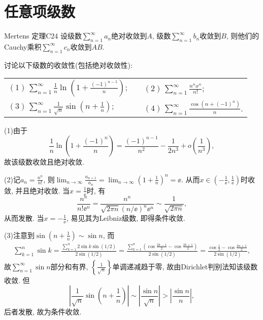 \section{任意项级数}
\begin{theorem}{Mertens 定理}{C24}
设级数\(\sum_{n=1}^{\infty}a_n\)绝对收敛到\(A\), 级数\(\sum_{n=1}^{\infty}b_n\)收敛到\(B\), 则他们的Cauchy乘积\(\sum_{n=1}^{\infty}c_n\)收敛到\(AB\).
\end{theorem}
\begin{quiza}
\woe 讨论以下级数的收敛性(包括绝对收敛性):\vspace{8pt}\\
\begin{tabular}{lcl}
\((1)\,\sum_{n=1}^{\infty}\frac{1}{n}\ln\left(1+\frac{(-1)^{n-1}}{n}\right)\);&\qquad\qquad\qquad&\((2)\,\sum_{n=1}^{\infty}\frac{n^nx^n}{n!}\);\vspace{0.3cm}\\
\((3)\,\sum_{n=1}^{\infty}\frac{1}{\sqrt{n}}\sin\left(n+\frac{1}{n}\right)\);&&\((4)\,\sum_{n=1}^{\infty}\frac{\cos(n+(-1)^n)}{n}\).
\end{tabular}
\begin{solution}
(1)由于\[\frac{1}{n}\ln\left(1+\frac{(-1)^n}{n}\right)=\frac{(-1)^{n-1}}{n^2}-\frac{1}{2n^3}+o\left(\frac{1}{n^3}\right),\]故该级数收敛且绝对收敛.

(2)记\(a_{n}=\frac{n^n}{n!}\), 则\(\lim_{n\rightarrow\infty}\frac{a_{n+1}}{a_{n}}=\lim_{n\rightarrow\infty}\left(1+\frac{1}{n}\right)^n=\ee.\) 从而\(x\in\left(-\frac{1}{\ee},\frac{1}{\ee}\right)\)时收敛, 并且绝对收敛. 当\(x=\frac{1}{\ee}\)时, 有\[\frac{n^n}{n!\ee^n}=\frac{n^n}{\sqrt{2\pi n}(n/\ee)^n\ee^n}\sim\frac{1}{\sqrt{2\pi n}},\]从而发散. 当\(x=-\frac{1}{\ee}\), 易见其为Leibniz级数, 即得条件收敛.

(3)注意到\(\sin\left(n+\frac{1}{n}\right)\sim\sin n\), 而\[\begin{split}
\sum_{k=1}^{n}\sin k=\frac{\displaystyle\sum_{k=1}^{n}2\sin k\sin(1/2)}{2\sin(1/2)}=\frac{\displaystyle\sum_{k=1}^{n}\left(\cos\frac{2k-1}{2}-\cos\frac{2k+1}{2}\right)}{2\sin(1/2)}=\frac{\displaystyle\cos\frac{1}{2}-\cos\frac{2n+1}{2}}{2\sin(1/2)},
\end{split}\]故\(\sum_{n=1}^{\infty}\sin n\)部分和有界, \(\left\lbrace \frac{1}{\sqrt{n}}\right\rbrace \)单调递减趋于零, 故由Dirichlet判别法知该级数收敛. 但\[\left|\frac{1}{\sqrt{n}}\sin\left(n+\frac{1}{n}\right)\right|\sim\left|\frac{\sin n}{\sqrt{n}}\right|>\left|\frac{\sin n}{n}\right|,\]后者发散, 故为条件收敛.


\end{solution}
\end{quiza}
